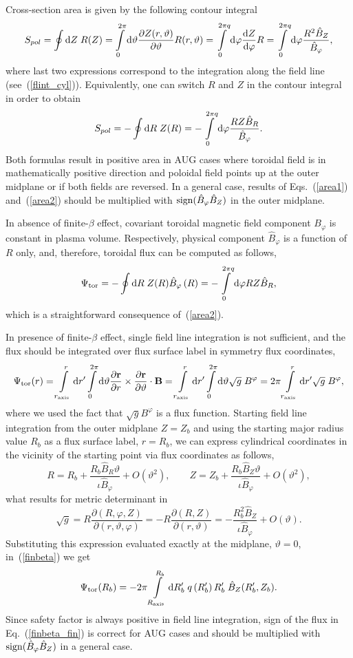 \documentclass[12pt]{article}
\newcommand{\be}[1]{\begin{equation} \label{#1}}
\newcommand{\ee}{\end{equation}}
\newcommand{\eq}[1]{(\ref{#1})}
\newcommand{\difp}[2]{\frac{\partial #1}{\partial #2}}
\newcommand{\br}{{\bf r}}
\newcommand{\bB}{{\bf B}}
\newcommand{\rd}{{\rm d}}
\begin{document}
\noindent
Cross-section area is given by the following contour integral
\be{area1}
S_{pol}=\oint \rd Z\; R(Z) = \int\limits_0^{2\pi}\rd\vartheta \difp{Z(r,\vartheta)}{\vartheta} R(r,\vartheta)
=\int\limits_0^{2\pi q}\rd\varphi \frac{\rd Z}{\rd \varphi} R = \int\limits_0^{2\pi q}\rd\varphi \frac{R^2\hat B_Z}{\hat B_\varphi},
\ee
where last two expressions correspond to the integration along the field line (see~\eq{flint_cyl}). 
Equivalently, one can switch $R$ and $Z$ in the contour integral in order to obtain
\be{area2}
S_{pol}= - \oint \rd R\; Z(R) = - \int\limits_0^{2\pi q}\rd\varphi \frac{R Z\hat B_R}{\hat B_\varphi}.
\ee
Both formulas result in positive area in AUG cases where toroidal field is in mathematically positive direction and poloidal
field points up at the outer midplane or if both fields are reversed. In a general case, results of Eqs.~\eq{area1} and~\eq{area2}
should be multiplied with ${\rm sign}(\hat B_\varphi \hat B_Z)$ in the outer midplane.

\noindent
In absence of finite-$\beta$ effect, covariant toroidal magnetic field component $B_\varphi$ is constant in plasma volume. Respectively,
physical component $\hat B_\varphi$ is a function of $R$ only, and, therefore, toroidal flux can be computed as follows,
\be{torflux_vac}
\Psi_{\rm tor}
= - \oint \rd R \; Z(R) \hat B_\varphi\left(R\right) 
= - \int\limits_0^{2\pi q}\rd\varphi R Z \hat B_R,
\ee
which is a straightforward consequence of~\eq{area2}.

\noindent
In presence of finite-$\beta$ effect, single field line integration is not sufficient, and the flux should be integrated over flux surface label
in symmetry flux coordinates,
\be{finbeta}
\Psi_{\rm tor}(r) 
= \int\limits_{r_{\rm axis}}^r \rd r^\prime \int\limits_0^{2\pi}\rd\vartheta \difp{\br}{r}\times\difp{\br}{\vartheta}\cdot \bB
=\int\limits_{r_{\rm axis}}^r \rd r^\prime \int\limits_0^{2\pi}\rd\vartheta \sqrt{g}\; B^\varphi
= 2\pi \int\limits_{r_{\rm axis}}^r \rd r^\prime \sqrt{g}\; B^\varphi,
\ee
where we used the fact that $\sqrt{g} B^\varphi$ is a flux function. Starting field line integration from the outer midplane $Z=Z_b$ 
and using the starting major radius value $R_b$ as a flux surface label, $r=R_b$, we can express cylindrical coordinates in the vicinity 
of the starting point via flux coordinates as follows,
\be{vicinity}
R = R_b + \frac{R_b \hat B_R \vartheta}{\iota \hat B_\varphi}+O(\vartheta^2),
\qquad
Z = Z_b + \frac{R_b \hat B_Z \vartheta}{\iota \hat B_\varphi}+O(\vartheta^2),
\ee
what results for metric determinant in
\be{sqrtg}
\sqrt{g}=R\difp{(R,\varphi,Z)}{(r,\vartheta,\varphi)}=-R\difp{(R,Z)}{(r,\vartheta)}=-\frac{R_b^2 \hat B_Z}{\iota \hat B_\varphi}+O(\vartheta).
\ee
Substituting this expression evaluated exactly at the midplane, $\vartheta=0$, in~\eq{finbeta} we get
\be{finbeta_fin}
\Psi_{\rm tor}(R_b) 
= - 2\pi \int\limits_{R_{\rm axis}}^{R_b} \rd R_b^\prime\; q\left(R_b^\prime\right) R_b^\prime\;\hat B_Z(R_b^\prime,Z_b).
\ee
Since safety factor is always positive in field line integration, sign of the flux in Eq.~\eq{finbeta_fin} is correct for AUG cases 
and should be multiplied with ${\rm sign}(\hat B_\varphi \hat B_Z)$ in a general case.
\end{document}
